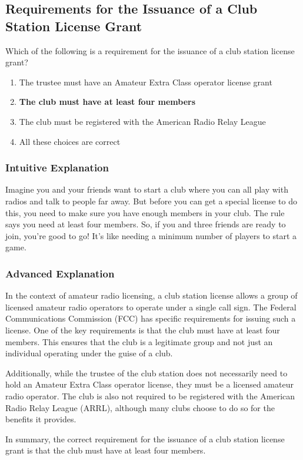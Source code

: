 \subsection{Requirements for the Issuance of a Club Station License Grant}
\label{T1F11}

\begin{tcolorbox}[colback=gray!10!white,colframe=black!75!black,title=T1F11]
Which of the following is a requirement for the issuance of a club station license grant?
\begin{enumerate}[label=\Alph*]
    \item The trustee must have an Amateur Extra Class operator license grant
    \item \textbf{The club must have at least four members}
    \item The club must be registered with the American Radio Relay League
    \item All these choices are correct
\end{enumerate}
\end{tcolorbox}

\subsubsection{Intuitive Explanation}
Imagine you and your friends want to start a club where you can all play with radios and talk to people far away. But before you can get a special license to do this, you need to make sure you have enough members in your club. The rule says you need at least four members. So, if you and three friends are ready to join, you’re good to go! It’s like needing a minimum number of players to start a game.

\subsubsection{Advanced Explanation}
In the context of amateur radio licensing, a club station license allows a group of licensed amateur radio operators to operate under a single call sign. The Federal Communications Commission (FCC) has specific requirements for issuing such a license. One of the key requirements is that the club must have at least four members. This ensures that the club is a legitimate group and not just an individual operating under the guise of a club.

Additionally, while the trustee of the club station does not necessarily need to hold an Amateur Extra Class operator license, they must be a licensed amateur radio operator. The club is also not required to be registered with the American Radio Relay League (ARRL), although many clubs choose to do so for the benefits it provides.

In summary, the correct requirement for the issuance of a club station license grant is that the club must have at least four members.


